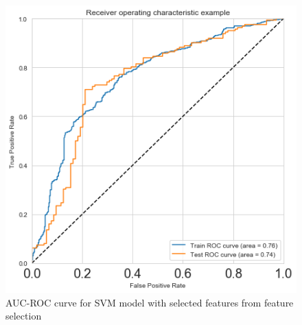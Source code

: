 \documentclass[format=sigconf]{acmart}
\begin{document}
\begin{figure}[H]
    \centering
    \includegraphics[scale=0.50]{AUC_ROC_SVM_Model_3.png}
    \caption{AUC-ROC curve for SVM model with selected features from feature selection}
    \label{fig:aucrocmodel3}
\end{figure}
\end{document}
